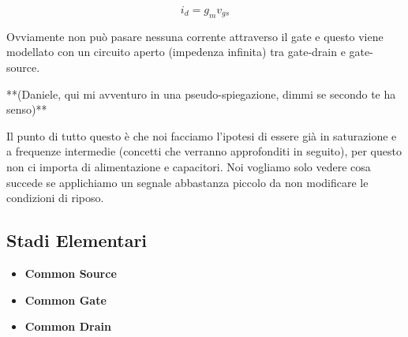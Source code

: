 \documentclass[a4paper,twocolumn,notitlepage]{book}
\begin{document}
\begin{equation}
	i_{d}=g_{m}v_{gs}
\end{equation}

Ovviamente non può pasare nessuna corrente attraverso il gate e questo viene modellato con un circuito aperto (impedenza infinita) tra gate-drain e gate-source.

**(Daniele, qui mi avventuro in una pseudo-spiegazione, dimmi se secondo te ha senso)**

Il punto di tutto questo è che noi facciamo l'ipotesi di essere già in saturazione e a frequenze intermedie (concetti che verranno approfonditi in seguito), per questo non ci importa di alimentazione e capacitori. Noi vogliamo solo vedere cosa succede se applichiamo un segnale abbastanza piccolo da non modificare le condizioni di riposo.

		\subsection*{Stadi Elementari}
		
		\begin{itemize}
				\item \textbf{Common Source}
				\item \textbf{Common Gate}
				\item \textbf{Common Drain}
		\end{itemize}
			
\end{document}
